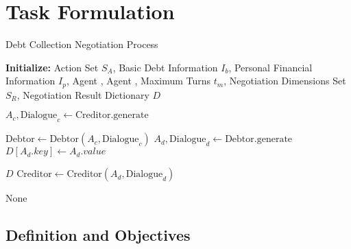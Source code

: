 \section{Task Formulation} \label{sec:task}


\begin{algorithm}[!htb]
    \caption{\label{alg:1}Debt Collection Negotiation Process}
    \label{alg:2}
    \begin{algorithmic}
        \STATE \textbf{Initialize:} Action Set $S_A$, Basic Debt Information $I_b$, Personal Financial Information $I_p$, Agent , Agent , Maximum Turns $t_m$, Negotiation Dimensions Set $S_R$, Negotiation Result Dictionary $D$
        
        
            \STATE $ A_c, \text{Dialogue}_c \gets \text{Creditor.generate}$
            
            \STATE $\text{Debtor} \gets \text{Debtor}(A_c, \text{Dialogue}_c)$
            \STATE $A_d, \text{Dialogue}_d \gets \text{Debtor.generate}$
                \STATE $D[A_d.key] \gets A_d.value $ 

            \ENDIF
                \RETURN $D$
            \ENDIF   
            \STATE $\text{Creditor} \gets \text{Creditor}(A_d, \text{Dialogue}_d)$
        \ENDFOR
        
        \RETURN None
    \end{algorithmic}
\end{algorithm}


\subsection{Definition and Objectives}\label{obj}


